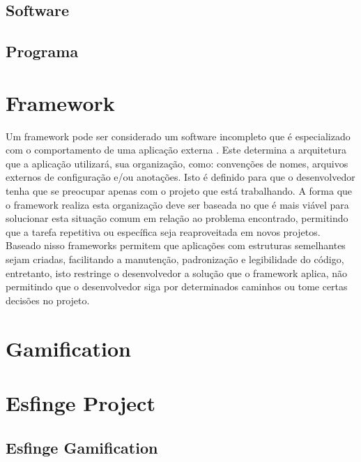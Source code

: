 \subsection{Software}

\subsection{Programa}

\section{Framework}

\par Um framework pode ser considerado um software incompleto que é especializado com o comportamento de uma aplicação externa \cite{johnson1988designing}. Este determina a arquitetura que a aplicação utilizará, sua organização, como: convenções de nomes, arquivos externos de configuração e/ou anotações. Isto é definido para que o desenvolvedor tenha que se preocupar apenas com o projeto que está trabalhando. A forma que o framework realiza esta organização deve ser baseada no que é mais viável para solucionar esta situação comum em relação ao problema encontrado, permitindo que a tarefa repetitiva ou específica seja reaproveitada em novos projetos.
Baseado nisso frameworks permitem que aplicações com estruturas semelhantes sejam criadas, facilitando a manutenção, padronização e legibilidade do código, entretanto, isto restringe o desenvolvedor a solução que o framework aplica, não permitindo que o desenvolvedor siga por determinados caminhos ou tome certas decisões no projeto.\cite{gamma2009padroes}

\section{Gamification}

\section{Esfinge Project}

\subsection{Esfinge Gamification}